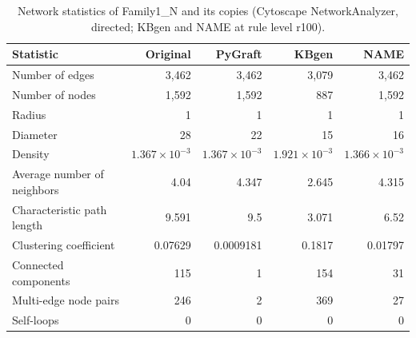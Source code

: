 \begin{table}[t]
\centering
\caption{Network statistics of Family1\_N and its copies (Cytoscape NetworkAnalyzer, directed; KBgen and NAME at rule level r100).}
\label{tab:cytoscape_Family1_N}
\begin{tabular}{lrrrr}
\toprule
Statistic & Original & PyGraft & KBgen & NAME \\
\midrule
Number of edges & 3{,}462 & 3{,}462 & 3{,}079 & 3{,}462 \\
Number of nodes & 1{,}592 & 1{,}592 & 887 & 1{,}592 \\
Radius & 1 & 1 & 1 & 1 \\
Diameter & 28 & 22 & 15 & 16 \\
Density & $1.367\times10^{-3}$ & $1.367\times10^{-3}$ & $1.921\times10^{-3}$ & $1.366\times10^{-3}$ \\
Average number of neighbors & 4.04 & 4.347 & 2.645 & 4.315 \\
Characteristic path length & 9.591 & 9.5 & 3.071 & 6.52 \\
Clustering coefficient & 0.07629 & 0.0009181 & 0.1817 & 0.01797 \\
Connected components & 115 & 1 & 154 & 31 \\
Multi-edge node pairs & 246 & 2 & 369 & 27 \\
Self-loops & 0 & 0 & 0 & 0 \\
\bottomrule
\end{tabular}
\end{table}
